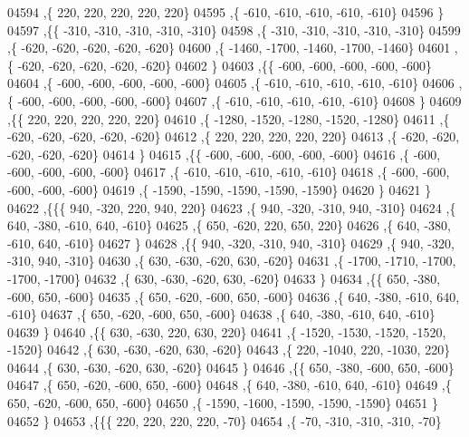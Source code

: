 \begin{DoxyCode}
04594     ,\{   220,   220,   220,   220,   220\}
04595     ,\{  -610,  -610,  -610,  -610,  -610\}
04596     \}
04597    ,\{\{  -310,  -310,  -310,  -310,  -310\}
04598     ,\{  -310,  -310,  -310,  -310,  -310\}
04599     ,\{  -620,  -620,  -620,  -620,  -620\}
04600     ,\{ -1460, -1700, -1460, -1700, -1460\}
04601     ,\{  -620,  -620,  -620,  -620,  -620\}
04602     \}
04603    ,\{\{  -600,  -600,  -600,  -600,  -600\}
04604     ,\{  -600,  -600,  -600,  -600,  -600\}
04605     ,\{  -610,  -610,  -610,  -610,  -610\}
04606     ,\{  -600,  -600,  -600,  -600,  -600\}
04607     ,\{  -610,  -610,  -610,  -610,  -610\}
04608     \}
04609    ,\{\{   220,   220,   220,   220,   220\}
04610     ,\{ -1280, -1520, -1280, -1520, -1280\}
04611     ,\{  -620,  -620,  -620,  -620,  -620\}
04612     ,\{   220,   220,   220,   220,   220\}
04613     ,\{  -620,  -620,  -620,  -620,  -620\}
04614     \}
04615    ,\{\{  -600,  -600,  -600,  -600,  -600\}
04616     ,\{  -600,  -600,  -600,  -600,  -600\}
04617     ,\{  -610,  -610,  -610,  -610,  -610\}
04618     ,\{  -600,  -600,  -600,  -600,  -600\}
04619     ,\{ -1590, -1590, -1590, -1590, -1590\}
04620     \}
04621    \}
04622   ,\{\{\{   940,  -320,   220,   940,   220\}
04623     ,\{   940,  -320,  -310,   940,  -310\}
04624     ,\{   640,  -380,  -610,   640,  -610\}
04625     ,\{   650,  -620,   220,   650,   220\}
04626     ,\{   640,  -380,  -610,   640,  -610\}
04627     \}
04628    ,\{\{   940,  -320,  -310,   940,  -310\}
04629     ,\{   940,  -320,  -310,   940,  -310\}
04630     ,\{   630,  -630,  -620,   630,  -620\}
04631     ,\{ -1700, -1710, -1700, -1700, -1700\}
04632     ,\{   630,  -630,  -620,   630,  -620\}
04633     \}
04634    ,\{\{   650,  -380,  -600,   650,  -600\}
04635     ,\{   650,  -620,  -600,   650,  -600\}
04636     ,\{   640,  -380,  -610,   640,  -610\}
04637     ,\{   650,  -620,  -600,   650,  -600\}
04638     ,\{   640,  -380,  -610,   640,  -610\}
04639     \}
04640    ,\{\{   630,  -630,   220,   630,   220\}
04641     ,\{ -1520, -1530, -1520, -1520, -1520\}
04642     ,\{   630,  -630,  -620,   630,  -620\}
04643     ,\{   220, -1040,   220, -1030,   220\}
04644     ,\{   630,  -630,  -620,   630,  -620\}
04645     \}
04646    ,\{\{   650,  -380,  -600,   650,  -600\}
04647     ,\{   650,  -620,  -600,   650,  -600\}
04648     ,\{   640,  -380,  -610,   640,  -610\}
04649     ,\{   650,  -620,  -600,   650,  -600\}
04650     ,\{ -1590, -1600, -1590, -1590, -1590\}
04651     \}
04652    \}
04653   ,\{\{\{   220,   220,   220,   220,   -70\}
04654     ,\{   -70,  -310,  -310,  -310,   -70\}

\end{DoxyCode}
